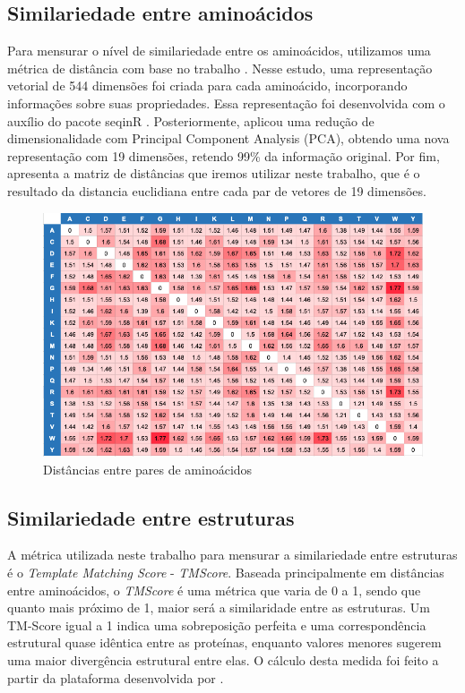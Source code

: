 \subsection{Similariedade entre aminoácidos}
Para mensurar o nível de similariedade entre os aminoácidos, utilizamos uma métrica de distância com base no trabalho \cite{aminodist}.
Nesse estudo, uma representação vetorial de 544 dimensões foi criada para cada aminoácido, incorporando informações sobre suas propriedades.
Essa representação foi desenvolvida com o auxílio do pacote seqinR \cite{seqinR}. 
Posteriormente, \cite{aminodist} aplicou uma redução de dimensionalidade com Principal Component Analysis (PCA), 
obtendo uma nova representação com 19 dimensões, retendo 99\% da informação original. 
Por fim, \cite{aminodist} apresenta a matriz de distâncias que iremos utilizar neste trabalho,
que é o resultado da distancia euclidiana entre cada par de vetores de 19 dimensões. 

\begin{figure}[H]
    \centering
    \includegraphics[width=.8\textwidth]{figuras/matrix_amino_dist.png}
    \caption{Distâncias entre pares de aminoácidos \cite{aminodist}}
    \label{fig:matrixaminodist}
  \end{figure}


\subsection{Similariedade entre estruturas}
\label{subsection:tmscore}
A métrica utilizada neste trabalho para mensurar a similariedade entre estruturas é o \textit{Template Matching Score} - \textit{TMScore}. 
Baseada principalmente em distâncias entre aminoácidos, o \textit{TMScore} é uma métrica que varia de 0 a 1,
sendo que quanto mais próximo de 1, maior será a similaridade entre as estruturas. 
Um TM-Score igual a 1 indica uma sobreposição perfeita e uma correspondência estrutural quase idêntica entre as proteínas, 
enquanto valores menores sugerem uma maior divergência estrutural entre elas. 
O cálculo desta medida foi feito a partir da plataforma desenvolvida por \cite{USalign}.


